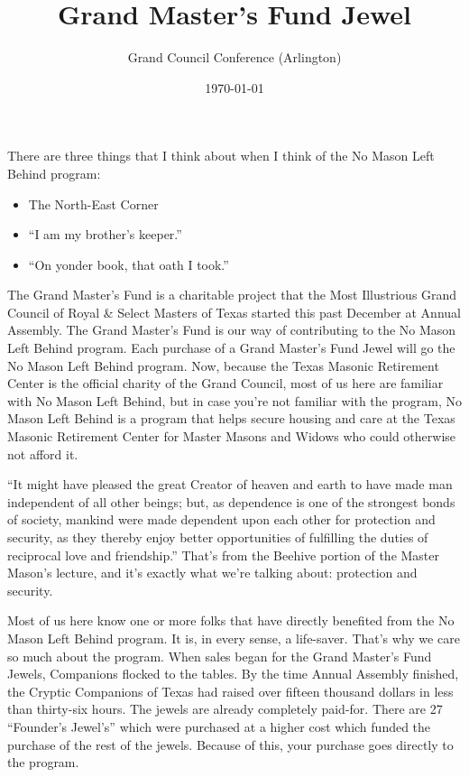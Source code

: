 \documentclass{article}
\title{\vspace*{-3em}Grand Master's Fund Jewel}
\author{Grand Council Conference (Arlington)}
\date{\today}
\begin{document}
	\maketitle
	\begin{multicols*}{2}
		There are three things that I think about when I think of the No Mason Left Behind program:
		\begin{itemize}
			\item The North-East Corner
			\item ``I am my brother's keeper.''
			\item ``On yonder book, that oath I took.''
		\end{itemize}
		The Grand Master's Fund is a charitable project that the Most Illustrious Grand Council of Royal \& Select Masters of Texas started this past December at Annual Assembly. The Grand Master's Fund is our way of contributing to the No Mason Left Behind program. Each purchase of a Grand Master's Fund Jewel will go the No Mason Left Behind program. Now, because the Texas Masonic Retirement Center is the official charity of the Grand Council, most of us here are familiar with No Mason Left Behind, but in case you're not familiar with the program, No Mason Left Behind is a program that helps secure housing and care at the Texas Masonic Retirement Center for Master Masons and Widows who could otherwise not afford it.
		
		``It might have pleased the great Creator of heaven and earth to have made man independent of all other beings; but, as dependence is one of the strongest bonds of society, mankind were made dependent upon each other for protection and security, as they thereby enjoy better opportunities of fulfilling the duties of reciprocal love and friendship.'' That's from the Beehive portion of the Master Mason's lecture, and it's exactly what we're talking about: protection and security.
		
		Most of us here know one or more folks that have directly benefited from the No Mason Left Behind program. It is, in every sense, a life-saver. That's why we care so much about the program. When sales began for the Grand Master's Fund Jewels, Companions flocked to the tables. By the time Annual Assembly finished, the Cryptic Companions of Texas had raised over fifteen thousand dollars in less than thirty-six hours. The jewels are already completely paid-for. There are 27 ``Founder's Jewel's'' which were purchased at a higher cost which funded the purchase of the rest of the jewels. Because of this, your purchase goes directly to the program.  
		

\end{multicols*}
\end{document}
